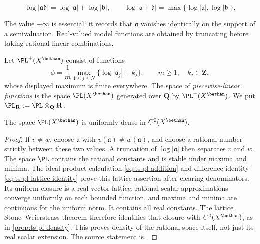 \[
 \log|\mathfrak a\mathfrak b|
   =\log|\mathfrak a|+\log|\mathfrak b|,
 \qquad
 \log|\mathfrak a+\mathfrak b|
   =\max\{\log|\mathfrak a|,\log|\mathfrak b|\}.
\tag{59.4}\label{eq:mp-tropical-ideal-laws}
\]

The value $-\infty$ is essential: it records that $\mathfrak a$ vanishes
identically on the support of a semivaluation.  Real-valued model functions
are obtained by truncating before taking rational linear combinations.

\begin{samepage}
\begin{definition}
\label{def:mp-pl-functions}
Let $\PL^+(X^{\bethan})$ consist of functions
\[
  \phi=\frac1m\max_{1\leq j\leq N}
       \{\log|\mathfrak a_j|+k_j\},
  \qquad m\geq1,\quad k_j\in\mathbf Z,
\tag{59.5}\label{eq:mp-pl-plus}
\]
whose displayed maximum is finite everywhere. The space of
\emph{piecewise-linear functions} is the space
$\PL(X^{\bethan})$ generated over $\mathbf Q$ by
$\PL^+(X^{\bethan})$. We put
$\PL_{\mathbf R}:=\PL\otimes_{\mathbf Q}\mathbf R$.
\end{definition}
\end{samepage}

\begin{proposition}\label{prop:mp-pl-dense}
The space $\PL(X^{\bethan})$ is uniformly dense in
$C^0(X^{\bethan})$.
\end{proposition}

\begin{proof}
If $v\ne w$, choose $\mathfrak a$ with
$v(\mathfrak a)\ne w(\mathfrak a)$, and choose a rational number strictly
between these two values.  A truncation of $\log|\mathfrak a|$ then
separates $v$ and $w$.  The space $\PL$ contains the rational
constants and is stable under maxima and minima.  The ideal-product calculation
\eqref{eq:ts-pl-addition} and difference identity
\eqref{eq:ts-pl-lattice-identity} prove this lattice assertion after
clearing denominators. Its uniform closure is a real vector lattice:
rational scalar approximations converge uniformly on each bounded function,
and maxima and minima are continuous for the uniform norm. It contains
all real constants. The lattice Stone--Weierstrass theorem therefore
identifies that closure with $C^0(X^{\bethan})$, as in
\cref{prop:ts-pl-density}. This proves density of the rational space itself,
not just its real scalar extension. The source statement is
\cite[Lemma~1.4.3 and Proposition~1.4.4]{MPTropicalV2}.
\end{proof}


